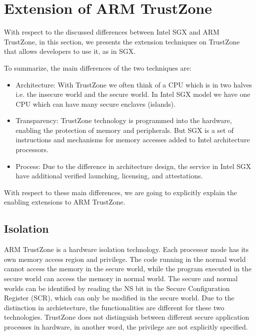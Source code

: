 \section{Extension of ARM TrustZone}\label{sec:extensions}

With respect to the discussed differences between Intel SGX and ARM TrustZone,
 in this section, we presents the extension techniques on TrustZone that allows developers to use it, as in SGX.

To summarize, the main differences of the two techniques are:
\begin{itemize}
\item Architecture: With TrustZone we often think of a CPU which is in two halves i.e. the insecure world and the secure world. In Intel SGX model we have one CPU which can have many secure enclaves (islands).
\item Transparency: TrustZone technology is programmed into the hardware, enabling the protection of memory and peripherals. But SGX is a set of instructions and mechanisms for memory accesses added to Intel architecture processors.
\item Process: Due to the difference in architecture design, the service in Intel SGX have additional verified launching, licensing, and attestations.
\end{itemize}

With respect to these main differences,  we are going to explicitly explain 
the enabling extensions to ARM TrustZone.

\subsection{Isolation}
ARM TrustZone is a hardware isolation technology. Each processor mode has its
own memory access region and privilege. The code running in the normal world
cannot access the memory in the secure world, while the program executed in 
the secure world can access the memory in normal world. The secure and normal 
worlds can be identified by reading the NS bit in the Secure Configuration 
Register (SCR), which can only be modified in the secure world.
Due to the distinction in archietecture, the functionalities are different for 
these two technologies. TrustZone does not distinguish between different 
secure application processes in hardware, in another word, the privilege are
not explicitly specified. 

